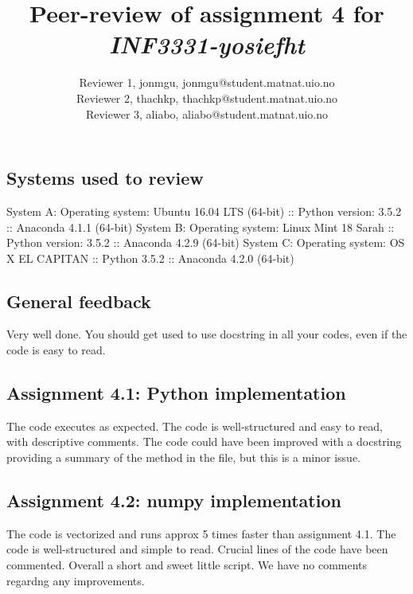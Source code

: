 \documentclass[a4paper]{article}
\title{Peer-review of assignment 4 for \textit{INF3331-yosiefht}}
\author{Reviewer 1, jonmgu, {jonmgu@student.matnat.uio.no} \\
 		Reviewer 2, thachkp, {thachkp@student.matnat.uio.no} \\
		Reviewer 3, aliabo, {aliabo@student.matnat.uio.no}}
\begin{document}
\maketitle
\subsection*{Systems used to review}
System A: \newline
Operating system: Ubuntu 16.04 LTS (64-bit) :: 
Python version: 3.5.2 :: Anaconda 4.1.1 (64-bit) \newline
System B: \newline
Operating system: Linux Mint 18 Sarah :: Python version: 3.5.2 :: Anaconda 4.2.9 (64-bit) \newline
System C: \newline
Operating system: OS X EL CAPITAN :: Python 3.5.2 :: Anaconda 4.2.0 (64-bit)
\newline

\subsection*{General feedback}
Very well done. You should get used to use docstring in all your codes, even if the code is easy to read.

\subsection*{Assignment 4.1: Python implementation}

The code executes as expected. The code is well-structured and easy to read, with descriptive comments.\newline
The code could have been improved with a docstring providing a summary of the method in the file, but this is a minor issue.

\subsection*{Assignment 4.2:  numpy implementation} \label{sec:assignment5.2}

The code is vectorized and runs approx 5 times faster than assignment 4.1. The code is well-structured and simple to read. Crucial lines of the code have been commented. Overall a short and sweet little script.\newline
We have no comments regardng any improvements.
\end{document}
